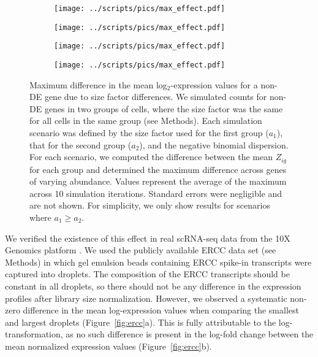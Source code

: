 \documentclass[10pt,letterpaper]{article}
\begin{document}
\begin{figure}[btp]
\centering
\begin{subfigure}[b]{0.49\textwidth}
    \texttt{[image: ../scripts/pics/max\_effect.pdf]}
    \caption{}
\end{subfigure}
\begin{subfigure}[b]{0.49\textwidth}
    \texttt{[image: ../scripts/pics/max\_effect.pdf]}
    \caption{}
\end{subfigure}
\begin{subfigure}[b]{0.49\textwidth}
    \texttt{[image: ../scripts/pics/max\_effect.pdf]}
    \caption{}
\end{subfigure}
\begin{subfigure}[b]{0.49\textwidth}
    \texttt{[image: ../scripts/pics/max\_effect.pdf]}
    \caption{}
\end{subfigure}
\caption{Maximum difference in the mean log$_2$-expression values for a non-DE gene due to size factor differences.
We simulated counts for non-DE genes in two groups of cells, where the size factor was the same for all cells in the same group (see Methods).
Each simulation scenario was defined by the size factor used for the first group ($a_1$), that for the second group ($a_2$), and the negative binomial dispersion.
For each scenario, we computed the difference between the mean $Z_{ig}$ for each group and determined the maximum difference across genes of varying abundance.
Values represent the average of the maximum across 10 simulation iterations.
Standard errors were negligible and are not shown.
For simplicity, we only show results for scenarios where $a_1 \ge a_2$.
}
\label{fig:maxeffect}
\end{figure}

We verified the existence of this effect in real scRNA-seq data from the 10X Genomics platform \cite{zheng2017massively}.
We used the publicly available ERCC data set (see Methods) in which gel emulsion beads containing ERCC spike-in transcripts were captured into droplets.
The composition of the ERCC transcripts should be constant in all droplets, so there should not be any difference in the expression profiles after library size normalization.
However, we observed a systematic non-zero difference in the mean log-expression values when comparing the smallest and largest droplets (Figure~\ref{fig:ercc}a).
This is fully attributable to the log-transformation, as no such difference is present in the log-fold change between the mean normalized expression values (Figure~\ref{fig:ercc}b).
\end{document}
